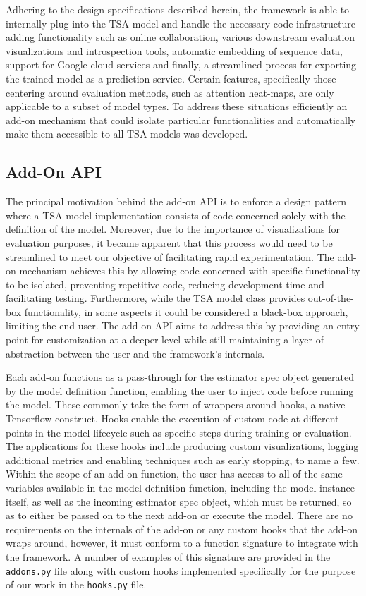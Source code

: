 \documentclass[12pt, a4paper]{report}
\theoremstyle{definition}
\theoremstyle{definition}%
\theoremstyle{definition}%
\theoremstyle{definition}%
\theoremstyle{definition}%
\theoremstyle{definition}%
\begin{document}
Adhering to the design specifications described herein, the framework is able to internally plug into the TSA model and handle the necessary code infrastructure adding functionality such as online collaboration, various downstream evaluation visualizations and introspection tools, automatic embedding of sequence data, support for Google cloud services and finally, a streamlined process for exporting the trained model as a prediction service. Certain features, specifically those centering around evaluation methods, such as attention heat-maps, are only applicable to a subset of model types. To address these situations efficiently an add-on mechanism that could isolate particular functionalities and automatically make them accessible to all TSA models was developed. 

\subsection{Add-On API}
The principal motivation behind the add-on API is to enforce a design pattern where a TSA model implementation consists of code concerned solely with the definition of the model. Moreover, due to the importance of visualizations for evaluation purposes, it became apparent that this process would need to be streamlined to meet our objective of facilitating rapid experimentation. The add-on mechanism achieves this by allowing code concerned with specific functionality to be isolated, preventing repetitive code, reducing development time and facilitating testing. Furthermore, while the TSA model class provides out-of-the-box functionality, in some aspects it could be considered a black-box approach, limiting the end user. The add-on API aims to address this by providing an entry point for customization at a deeper level while still maintaining a layer of abstraction between the user and the framework's internals.

Each add-on functions as a pass-through for the estimator spec object generated by the model definition function, enabling the user to inject code before running the model. These commonly take the form of wrappers around hooks, a native Tensorflow construct. Hooks enable the execution of custom code at different points in the model lifecycle such as specific steps during training or evaluation. The applications for these hooks include producing custom visualizations, logging additional metrics and enabling techniques such as early stopping, to name a few. Within the scope of an add-on function, the user has access to all of the same variables available in the model definition function, including the model instance itself, as well as the incoming estimator spec object, which must be returned, so as to either be passed on to the next add-on or execute the model. There are no requirements on the internals of the add-on or any custom hooks that the add-on wraps around, however, it must conform to a function signature to integrate with the framework. A number of examples of this signature are provided in the \texttt{addons.py} file along with custom hooks implemented specifically for the purpose of our work in the \texttt{hooks.py} file.  
\end{document}
